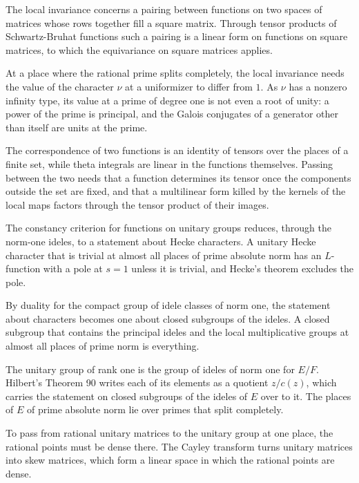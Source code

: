 The local invariance concerns a pairing between functions on two spaces of
matrices whose rows together fill a square matrix. Through tensor products of
Schwartz-Bruhat functions such a pairing is a linear form on functions on square
matrices, to which the equivariance on square matrices applies.

At a place where the rational prime splits completely, the local invariance
needs the value of the character $\nu$ at a uniformizer to differ from $1$. As
$\nu$ has a nonzero infinity type, its value at a prime of degree one is not
even a root of unity: a power of the prime is principal, and the Galois
conjugates of a generator other than itself are units at the prime.

The correspondence of two functions is an identity of tensors over the places
of a finite set, while theta integrals are linear in the functions themselves.
Passing between the two needs that a function determines its tensor once the
components outside the set are fixed, and that a multilinear form killed by the
kernels of the local maps factors through the tensor product of their images.

The constancy criterion for functions on unitary groups reduces, through the
norm-one ideles, to a statement about Hecke characters. A unitary Hecke
character that is trivial at almost all places of prime absolute norm has an
$L$-function with a pole at $s=1$ unless it is trivial, and Hecke's theorem
excludes the pole.

By duality for the compact group of idele classes of norm one, the statement
about characters becomes one about closed subgroups of the ideles. A closed
subgroup that contains the principal ideles and the local multiplicative groups
at almost all places of prime norm is everything.

The unitary group of rank one is the group of ideles of norm one for $E/F$.
Hilbert's Theorem 90 writes each of its elements as a quotient $z/c(z)$, which
carries the statement on closed subgroups of the ideles of $E$ over to it. The
places of $E$ of prime absolute norm lie over primes that split completely.

To pass from rational unitary matrices to the unitary group at one place, the
rational points must be dense there. The Cayley transform turns unitary
matrices into skew matrices, which form a linear space in which the rational
points are dense.

